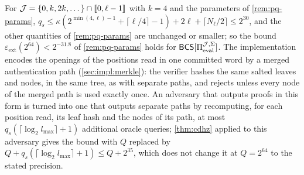 \begin{remark}\label{rem:skip-params}
For $\mathcal{J} = \{0, k, 2k, \dots\} \cap \llbracket 0, \ell-1 \rrbracket$ with $k = 4$ and the parameters of \cref{rem:pq-params}, $q_s \le \kappa(2^{\min(4,\ell)-1} + \lceil \ell/4 \rceil - 1) + 2\ell + \lceil N_\ell/2 \rceil \le 2^{30}$, and the other quantities of \cref{rem:pq-params} are unchanged or smaller; so the bound $\varepsilon_{\mathrm{ext}}(2^{64}) < 2^{-31.8}$ of \cref{rem:pq-params} holds for $\mathsf{BCS}[\Pi_{\mathrm{eval}}^{\mathcal{J},\Sigma}]$.
The implementation encodes the openings of the positions read in one committed word by a merged authentication path (\cref{sec:impl:merkle}): the verifier hashes the same salted leaves and nodes, in the same tree, as with separate paths, and rejects unless every node of the merged path is used exactly once.
An adversary that outputs proofs in this form is turned into one that outputs separate paths by recomputing, for each position read, its leaf hash and the nodes of its path, at most $q_s(\lceil \log_2 l_{\max} \rceil + 1)$ additional oracle queries; \cref{thm:cdhz} applied to this adversary gives the bound with $Q$ replaced by $Q + q_s(\lceil \log_2 l_{\max}\rceil + 1) \le Q + 2^{35}$, which does not change it at $Q = 2^{64}$ to the stated precision.
\end{remark}
